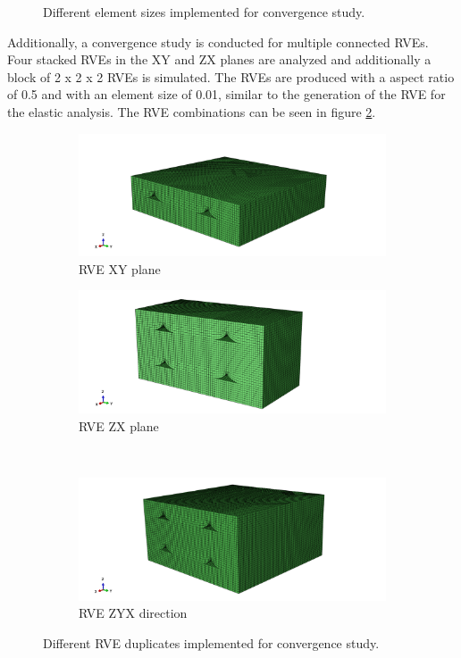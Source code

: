 \begin{figure}
  \caption{Different element sizes implemented for convergence study.}
  \label{fig:meshes}
\end{figure}

Additionally, a convergence study is conducted for multiple connected RVEs. Four stacked RVEs in the XY and ZX planes are analyzed and additionally a block of 2 x 2 x 2 RVEs is simulated. The RVEs are produced with a aspect ratio of 0.5 and with an element size of 0.01, similar to the generation of the RVE for the elastic analysis. The RVE combinations can be seen in figure \ref{fig:mulRVE}.

\begin{figure}
\centering
  \begin{subfigure}[b]{0.48\textwidth}
    \includegraphics[width=\textwidth]{chapter_7_non-elasticmodelling/figures/RVEXY.png}
    \caption{ RVE XY plane}
  \end{subfigure}
  \begin{subfigure}[b]{0.48\textwidth}
    \includegraphics[width=\textwidth]{chapter_7_non-elasticmodelling/figures/RVEZX.png}
    \caption{ RVE ZX plane}
  \end{subfigure}
  \\
    \begin{subfigure}[b]{0.48\textwidth}
    \includegraphics[width=\textwidth]{chapter_7_non-elasticmodelling/figures/RVEZYX.png}
    \caption{ RVE ZYX direction }
  \end{subfigure}
  
  \caption{Different RVE duplicates implemented for convergence study.}
  \label{fig:mulRVE}
\end{figure}

